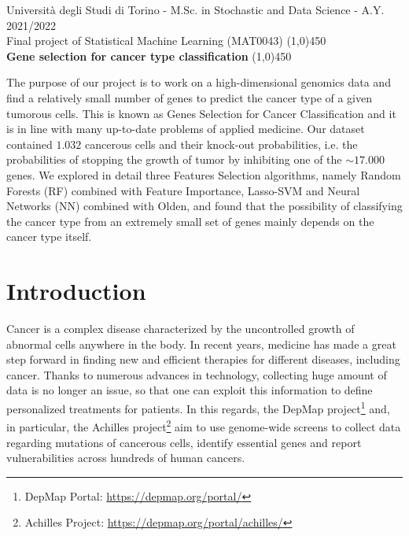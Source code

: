 \documentclass[a4paper,11pt, oneside]{article}  %
\begin{document}
\setcounter{secnumdepth}{2}
\pagestyle{plain} %

\begin{center}
	Università degli Studi di Torino - M.Sc.  in Stochastic and Data Science - A.Y.  2021/2022 \\
	\Large { Final project of Statistical Machine Learning (MAT0043)}
	\line(1,0){450}\\ 
	\vspace{0.4cm} 
	{ \huge \textbf{Gene selection for cancer type classification} }
	\vspace{0.1cm}
	\line(1,0){450} \\
\end{center}


The purpose of our project is to work on a high-dimensional genomics data and find a relatively small number of genes to predict the cancer type of a given tumorous cells. This is known as Genes Selection for Cancer Classification and it is in line with many up-to-date problems of applied medicine.  Our dataset contained $1.032$ cancerous cells and their knock-out probabilities, i.e. the probabilities of stopping the growth of tumor by inhibiting one of the $\sim 17.000$ genes.  We explored in detail three Features Selection algorithms,  namely Random Forests (RF) combined with Feature Importance,  Lasso-SVM and Neural Networks (NN) combined with Olden,  and found that the possibility of classifying the cancer type from an extremely small set of genes mainly depends on the cancer type itself.  


\section{Introduction}
Cancer is a complex disease characterized by the uncontrolled growth of abnormal cells anywhere in the body.  In recent years,  medicine has made a great step forward in finding new and efficient therapies for different diseases,  including cancer.  Thanks to numerous advances in technology,  collecting huge amount of data is no longer an issue,  so that one can exploit this information to define personalized treatments for patients.  In this regards,  the DepMap project\footnote{DepMap Portal: \url{https://depmap.org/portal/} } and,  in particular,  the Achilles project\footnote{Achilles Project: \url{https://depmap.org/portal/achilles/} } aim to use genome-wide screens to collect data regarding mutations of cancerous cells,  identify essential genes and report vulnerabilities across hundreds of human cancers. 
\end{document}
